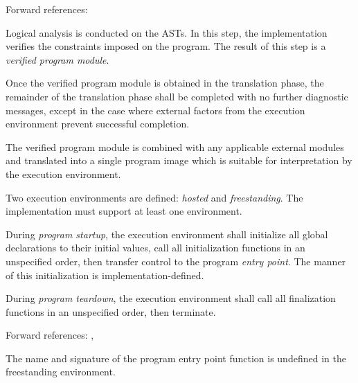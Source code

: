 Forward references: 

\specsubitem
Logical analysis is conducted on the ASTs. In this step, the implementation
verifies the constraints imposed on the program. The result of this step is a
\textit{verified program module}.


\specsubitem
Once the verified program module is obtained in the translation phase, the
remainder of the translation phase shall be completed with no further
diagnostic messages, except in the case where external factors from the
execution environment prevent successful completion.


\specsubitem
The verified program module is combined with any applicable external modules and
translated into a single program image which is suitable for interpretation by
the execution environment.


\specsubitem
Two execution environments are defined: \textit{hosted} and
\textit{freestanding}. The implementation must support at least one environment.

\specsubitem
During \textit{program startup}, the execution environment shall initialize all
global declarations to their initial values, call all initialization functions
in an unspecified order, then transfer control to the program \textit{entry
point}. The manner of this initialization is implementation-defined.


\specsubitem
During \textit{program teardown}, the execution environment shall call all
finalization functions in an unspecified order, then terminate.

Forward references: , 


\specsubsubitem
The name and signature of the program entry point function is undefined in the
freestanding environment.

